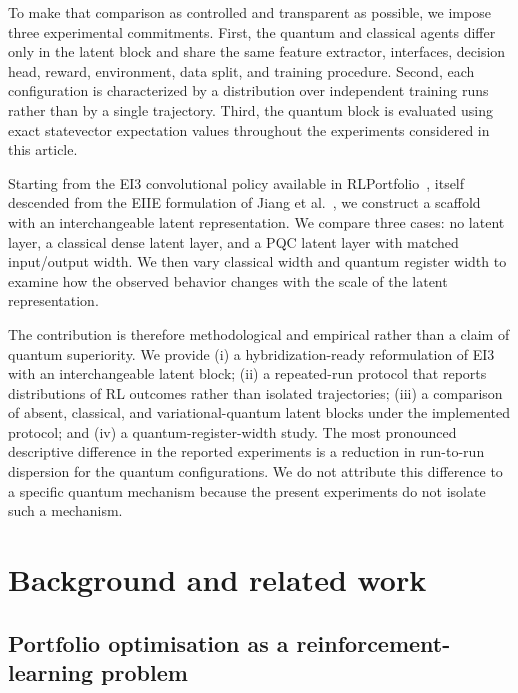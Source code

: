 \documentclass[aps,floatfix,superscriptaddress,twocolumn,tightenlines,amsmath,amssymb,nofootinbib,10pt,longbibliography,prl]{revtex4-2}
\begin{document}
To make that comparison as controlled and transparent as possible, we impose three
experimental commitments. First, the quantum and classical agents differ only in the latent
block and share the same feature extractor, interfaces, decision head, reward, environment,
data split, and training procedure. Second, each configuration is characterized by a
distribution over independent training runs rather than by a single trajectory. Third, the
quantum block is evaluated using exact statevector expectation values throughout the
experiments considered in this article.

Starting from the EI3 convolutional policy available in RLPortfolio~\cite{RLportfolio},
itself descended from the EIIE formulation of Jiang et
al.~\cite{jiang2017deepreinforcementlearningframework}, we construct a scaffold with an
interchangeable latent representation. We compare three cases: no latent layer, a classical
dense latent layer, and a PQC latent layer with matched input/output width. We then vary
classical width and quantum register width to examine how the observed behavior changes with
the scale of the latent representation.

The contribution is therefore methodological and empirical rather than a claim of quantum
superiority. We provide (i) a hybridization-ready reformulation of EI3 with an
interchangeable latent block; (ii) a repeated-run protocol that reports distributions of RL
outcomes rather than isolated trajectories; (iii) a comparison of absent, classical, and
variational-quantum latent blocks under the implemented protocol; and (iv) a
quantum-register-width study. The most pronounced descriptive difference in the reported
experiments is a reduction in run-to-run dispersion for the quantum configurations. We do
not attribute this difference to a specific quantum mechanism because the present
experiments do not isolate such a mechanism.
\section{Background and related work}
\label{sec:background}

\subsection{Portfolio optimisation as a reinforcement-learning problem}
\label{subsec:bg-portfolio}
\end{document}
